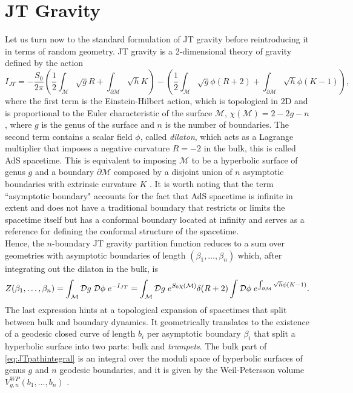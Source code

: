 \documentclass[a4paper,11pt]{article}
\begin{document}
\section{JT Gravity}\label{section_JT_random}
Let us turn now to the standard formulation of JT gravity before reintroducing it in terms of random geometry. JT gravity is a 2-dimensional theory of gravity defined by the action 
\begin{equation}
    I_{JT}=-\frac{S_0}{2\pi}\left(\frac{1}{2}\int_\mathcal{M}\sqrt{g}R+\int_{\partial\mathcal{M}}\sqrt{h}K\right)-\left(\frac{1}{2}\int_\mathcal{M}\sqrt{g} \phi (R+2) +\int_{\partial\mathcal{M}} \sqrt{h} \phi (K-1)\right)\label{eq:JTaction},
\end{equation}
where the first term is the Einstein-Hilbert action, which is topological in 2D and is proportional to the Euler characteristic of the surface $\mathcal{M}$, $\chi(\mathcal{M})=2-2g-n$, where $g$ is the genus of the surface and $n$ is the number of boundaries. The second term contains a scalar field $\phi$, called \textit{dilaton}, which acts as a Lagrange multiplier that imposes a negative curvature $R=-2$ in the bulk, this is called AdS spacetime. This is equivalent to imposing $\mathcal{M}$ to be a hyperbolic surface of genus $g$ and a boundary $\partial \mathcal{M}$ composed by a disjoint union of $n$ asymptotic boundaries with extrinsic curvature $K$ \cite{Saad:2019lba}. It is worth noting that the term ``asymptotic boundary" accounts for the fact that AdS spacetime is infinite in extent and does not have a traditional boundary that restricts or limits the spacetime itself but has a conformal boundary located at infinity and serves as a reference for defining the conformal structure of the spacetime.\\
Hence, the $n$-boundary JT gravity partition function reduces to a sum over geometries with asymptotic boundaries of length $(\beta_1,\dots, \beta_n)$ which, after integrating out the dilaton in the bulk, is
\begin{equation}
    Z(\beta_1,\dots,\beta_n)=\int_\mathcal{M} \mathcal{D}g\hspace{1mm}\mathcal{D}\phi \hspace{1mm} e^{-I_{JT}}= \int_{\mathcal{M}}
  \mathcal{D}g \hspace{1mm} e^{S_0 \chi(\mathcal{M})} \delta(R+2) \int\mathcal{D}\phi \hspace{1mm} e^{\int_{\partial\mathcal{M}} \sqrt{h} \phi (K-1)}.\label{eq:JTpathintegral}
\end{equation}
The last expression hints at a topological expansion of spacetimes that split between bulk and boundary dynamics. It geometrically translates to the existence of a geodesic closed curve of length $b_i$ per asymptotic boundary $\beta_i$ that split a hyperbolic surface into two parts: bulk and \textit{trumpets}. The bulk part of \eqref{eq:JTpathintegral} is an integral over the moduli space of hyperbolic surfaces of genus $g$ and $n$ geodesic boundaries, and it is given by the Weil-Petersson volume $V^{WP}_{g,n}(b_1,\dots,b_n)$ \cite{Mirzakhani}. 
\end{document}
